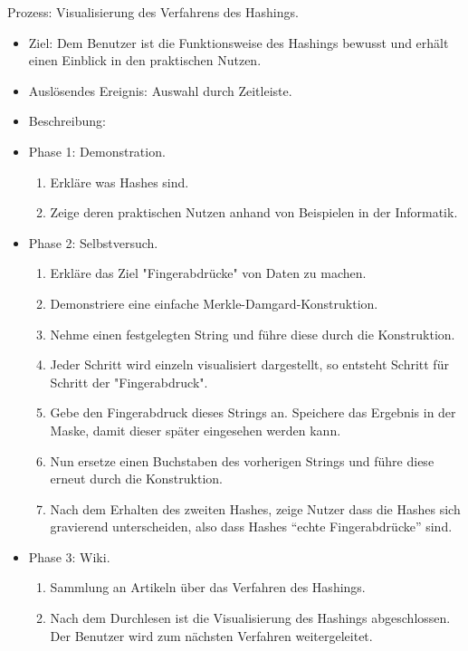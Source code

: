 \documentclass{article}
\begin{document}
\begin{FA}[start=600]
 \item Prozess: Visualisierung des Verfahrens des Hashings.
\end{FA}
\begin{itemize}[label={}]

 \item Ziel: Dem Benutzer ist die Funktionsweise des Hashings bewusst und erhält 
einen Einblick in den praktischen Nutzen.

 \item Auslösendes Ereignis: Auswahl durch Zeitleiste.

 \item Beschreibung:

 \item Phase 1: Demonstration.

	\begin{enumerate}[]
	 \item Erkläre was Hashes sind.
	 \item Zeige deren praktischen Nutzen anhand von Beispielen in der Informatik.
	\end{enumerate}

 \item Phase 2: Selbstversuch.

	\begin{enumerate}
	 \item Erkläre das Ziel "Fingerabdrücke" von Daten zu machen.
	 \item Demonstriere eine einfache Merkle-Damgard-Konstruktion.
	 \item Nehme einen festgelegten String und führe diese durch die Konstruktion.
	 \item Jeder Schritt wird einzeln visualisiert dargestellt, so entsteht Schritt für Schritt der "Fingerabdruck".
	 \item Gebe den Fingerabdruck dieses Strings an. Speichere das Ergebnis in der Maske, damit dieser später eingesehen werden kann.
	 \item Nun ersetze einen Buchstaben des vorherigen Strings und führe diese erneut durch die Konstruktion.
	 \item Nach dem Erhalten des zweiten Hashes, zeige Nutzer dass die Hashes sich gravierend unterscheiden, also dass Hashes ``echte Fingerabdrücke'' sind.
	\end{enumerate}

 \item Phase 3: Wiki.

	\begin{enumerate}
	 \item Sammlung an Artikeln über das Verfahren des Hashings.
	 \item Nach dem Durchlesen ist die Visualisierung des Hashings abgeschlossen. Der Benutzer wird zum nächsten Verfahren weitergeleitet.
 	\end{enumerate}

\end{itemize}
\end{document}
